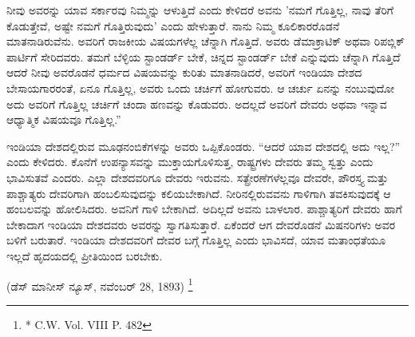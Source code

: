 ನೀವು ಅವರನ್ನು ಯಾವ ಸರ್ಕಾರವು ನಿಮ್ಮನ್ನು ಆಳುತ್ತಿದೆ ಎಂದು ಕೇಳಿದರೆ ಅವನು 'ನಮಗೆ ಗೊತ್ತಿಲ್ಲ, ನಾವು ತೆರಿಗೆ ಕೊಡುತ್ತೇವೆ, ಅಷ್ಟೇ ನಮಗೆ ಗೊತ್ತಿರುವುದು' ಎಂದು ಹೇಳುತ್ತಾರೆ. ನಾನು ನಿಮ್ಮ ಕೂಲಿಕಾರರೊಡನೆ ಮಾತನಾಡಿರುವೆನು. ಅವರಿಗೆ ರಾಜಕೀಯ ವಿಷಯಗಳೆಲ್ಲ ಚೆನ್ನಾಗಿ ಗೊತ್ತಿದೆ. ಅವರು ಡೆಮಾಕ್ರಾಟಿಕ್ ಅಥವಾ ರಿಪಬ್ಲಿಕ್ ಪಾರ್ಟಿಗೆ ಸೇರಿದವರು. ತಮಗೆ ಬೆಳ್ಳಿಯ ಸ್ಟಾಂಡರ್ಡ್ ಬೇಕೆ, ಚಿನ್ನದ ಸ್ಟಾಂಡರ್ಡ್ ಬೇಕೆ ಎನ್ನುವುದು ಚೆನ್ನಾಗಿ ಗೊತ್ತಿದೆ ಆದರೆ ನೀವು ಅವರೊಡನೆ ಧರ್ಮದ ವಿಷಯವನ್ನು ಕುರಿತು ಮಾತನಾಡಿದರೆ, ಅವರಿಗೆ ಇಂಡಿಯಾ ದೇಶದ ಬೇಸಾಯಗಾರರಂತೆ, ಏನೂ ಗೊತ್ತಿಲ್ಲ, ಅವರು ಒಂದು ಚರ್ಚಿಗೆ ಹೋಗುವರು. ಆ ಚರ್ಚು ಏನನ್ನು ನಂಬುವುದೋ ಅದು ಅವರಿಗೆ ಗೊತ್ತಿಲ್ಲ ಚರ್ಚಿಗೆ ಚಂದಾ ಹಣವನ್ನು ಕೊಡುವರು. ಅದಲ್ಲದೆ ಅವರಿಗೆ ದೇವರು ಅಥವಾ ಇನ್ನಾವ ಆಧ್ಯಾತ್ಮಿಕ ವಿಷಯವೂ ಗೊತ್ತಿಲ್ಲ.” 

ಇಂಡಿಯಾ ದೇಶದಲ್ಲಿರುವ ಮೂಢನಂಬಿಕೆಗಳನ್ನು ಅವರು ಒಪ್ಪಿಕೊಂಡರು. “ಆದರೆ ಯಾವ ದೇಶದಲ್ಲಿ ಅದು ಇಲ್ಲ?” ಎಂದು ಕೇಳಿದರು. ಕೊನೆಗೆ ಉಪನ್ಯಾಸವನ್ನು ಮುಕ್ತಾಯ\break ಗೊಳಿಸುತ್ತ, ರಾಷ್ಟ್ರಗಳು ದೇವರು ತಮ್ಮ ಸ್ವತ್ತು ಎಂದು ಭಾವಿಸುತವೆ ಎಂದರು. ಎಲ್ಲಾ ದೇಶದವರಿಗೂ ದೇವರು ಇರುವನು. ಸತ್ಪ್ರೇರಣೆಗಳೆಲ್ಲವೂ ದೇವರೇ, ಪೌರಸ್ತ್ಯ ಮತ್ತು ಪಾಶ್ಚಾತ್ಯರು ದೇವರಿಗಾಗಿ ಹಂಬಲಿಸುವುದನ್ನು ಕಲಿಯಬೇಕಾಗಿದೆ. ನೀರಿನಲ್ಲಿರುವವನು ಗಾಳಿಗಾಗಿ ತವಕಿಸುವುದಕ್ಕೆ ಆ ಹಂಬಲವನ್ನು ಹೋಲಿಸಿದರು. ಅವನಿಗೆ ಗಾಳಿ ಬೇಕಾಗಿದೆ. ಅದಿಲ್ಲದೆ ಅವನು ಬಾಳಲಾರ. ಪಾಶ್ಚಾತ್ಯರಿಗೆ ದೇವರು ಹಾಗೆ ಬೇಕಾದಾಗ ಇಂಡಿಯಾ ದೇಶದವರು ಅವರನ್ನು ಸ್ವಾಗತಿಸುತ್ತಾರೆ. ಏಕೆಂದರೆ ಆಗ ದೇವರೊಡನೆ ಮಿಷನರಿಗಳು ಅವರ ಬಳಿಗೆ ಬರುತಾರೆ. ಇಂಡಿಯಾ ದೇಶದವರಿಗೆ ದೇವರ ಬಗ್ಗೆ ಗೊತ್ತಿಲ್ಲ ಎಂದು ಭಾವಿಸದೆ, ಯಾವ ಮತಾಂಧತೆಯೂ ಇಲ್ಲದೆ ಹೃದಯದಲ್ಲಿ ಪ್ರೀತಿಯಿಂದ ಬರಬೇಕು.

\delimiter

\begin{center}
(ಡೆಸ್ ಮಾನೀಸ್ ನ್ಯೂಸ್, ನವೆಂಬರ್ 28, 1893) \footnote{* C.W. Vol. VIII P. 482}
\end{center}

